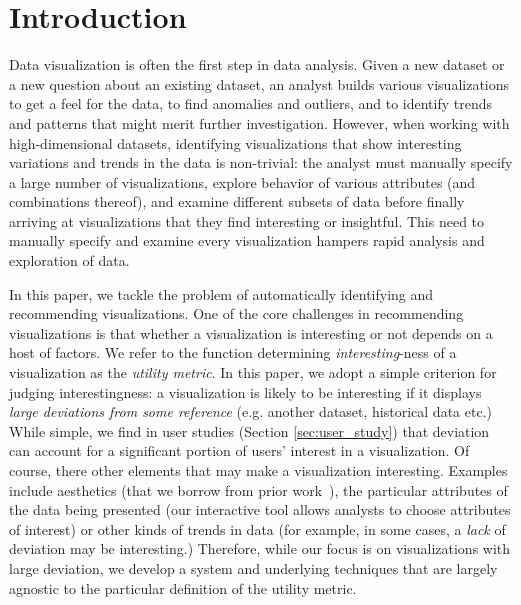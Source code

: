 
\section{Introduction}
\label{sec:introduction}
Data visualization is often the first step in data analysis.
Given a new dataset or a new question about an existing dataset, an analyst builds
various visualizations to get a feel for the data, to find anomalies and outliers, 
and to identify trends and patterns that might merit further investigation. 
However, when working with high-dimensional datasets, identifying visualizations that
show interesting variations and trends in the data is non-trivial:
the analyst must manually specify a large number of visualizations, explore behavior of various
attributes (and combinations thereof), and examine different subsets of data before finally 
arriving at visualizations that they find interesting or insightful.
This need to manually specify and examine every visualization hampers rapid analysis 
and exploration of data.

In this paper, we tackle the problem of automatically 
identifying and recommending 
visualizations.  
One of the core challenges in recommending visualizations is that 
whether a visualization is interesting or not
depends on a host of factors.
We refer to the function determining {\em interesting}-ness of a visualization
as the {\em utility metric}.
In this paper, we adopt a simple criterion for judging interestingness: 
a visualization is likely to be interesting if it displays 
{\em large deviations from some
reference} (e.g. another dataset, historical data etc.)
While simple, we find in user studies (Section \ref{sec:user_study}) 
that deviation can account for a significant portion of users' interest in a visualization.
Of course, there other elements that may make a visualization interesting.
Examples include aesthetics (that 
we borrow from prior work~\cite{polaris,Mackinlay:1986:ADG:22949.22950}), 
the particular attributes of the data being presented 
(our interactive tool allows analysts to choose attributes of interest) 
or other kinds of trends in
data (for example, in some cases, a {\it lack} of deviation may be interesting.)  
Therefore, while our focus is on visualizations with large deviation, 
we develop a system and underlying techniques that are largely agnostic to the
particular definition of the utility metric.


